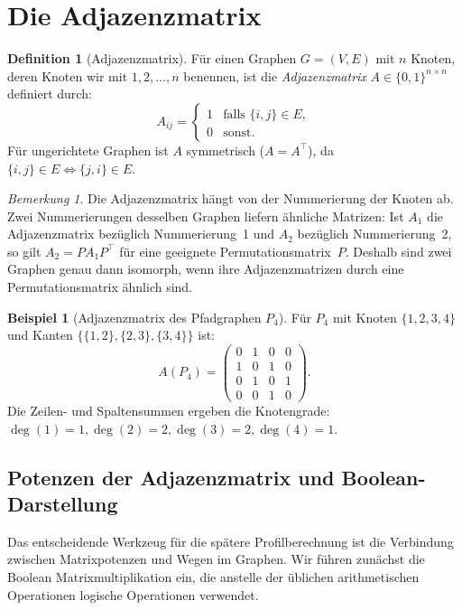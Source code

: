 ﻿\documentclass[a4paper,12pt,openany,oneside]{book}
\theoremstyle{definition}
\newtheorem{definition}{Definition}[chapter]
\newtheorem{beispiel}{Beispiel}[chapter]
\theoremstyle{plain}
\theoremstyle{remark}
\newtheorem{bemerkung}{Bemerkung}[chapter]
\begin{document}
\section{Die Adjazenzmatrix}

\begin{definition}[Adjazenzmatrix]
  F\"ur einen Graphen $G = (V,E)$ mit $n$ Knoten, deren Knoten wir mit
  $1, 2, \ldots, n$ benennen, ist die \emph{Adjazenzmatrix}
  $A \in \{0,1\}^{n \times n}$ definiert durch:
  \[
    A_{ij} = \begin{cases}
               1 & \text{falls } \{i,j\} \in E,\\
               0 & \text{sonst.}
             \end{cases}
  \]
  F\"ur ungerichtete Graphen ist $A$ symmetrisch ($A = A^\top$), da
  $\{i,j\} \in E \Leftrightarrow \{j,i\} \in E$.
\end{definition}

\begin{bemerkung}
  Die Adjazenzmatrix h\"angt von der Nummerierung der Knoten ab. Zwei
  Nummerierungen desselben Graphen liefern \"ahnliche Matrizen: Ist $A_1$
  die Adjazenzmatrix bez\"uglich Nummerierung~1 und $A_2$ bez\"uglich
  Nummerierung~2, so gilt $A_2 = P A_1 P^\top$ f\"ur eine geeignete
  Permutationsmatrix~$P$. Deshalb sind zwei Graphen genau dann isomorph,
  wenn ihre Adjazenzmatrizen durch eine Permutationsmatrix \"ahnlich sind.
\end{bemerkung}

\begin{beispiel}[Adjazenzmatrix des Pfadgraphen $P_4$]
  F\"ur $P_4$ mit Knoten $\{1,2,3,4\}$ und Kanten
  $\{\{1,2\},\{2,3\},\{3,4\}\}$ ist:
  \[
    A(P_4) = \begin{pmatrix}
               0 & 1 & 0 & 0\\
               1 & 0 & 1 & 0\\
               0 & 1 & 0 & 1\\
               0 & 0 & 1 & 0
             \end{pmatrix}.
  \]
  Die Zeilen- und Spaltensummen ergeben die Knotengrade:
  $\deg(1) = 1, \deg(2) = 2, \deg(3) = 2, \deg(4) = 1$.
\end{beispiel}

\subsection{Potenzen der Adjazenzmatrix und Boolean-Darstellung}

Das entscheidende Werkzeug f\"ur die sp\"atere Profilberechnung ist die
Verbindung zwischen Matrixpotenzen und Wegen im Graphen. Wir f\"uhren
zun\"achst die Boolean Matrixmultiplikation ein, die anstelle der
\"ublichen arithmetischen Operationen logische Operationen verwendet.
\end{document}
